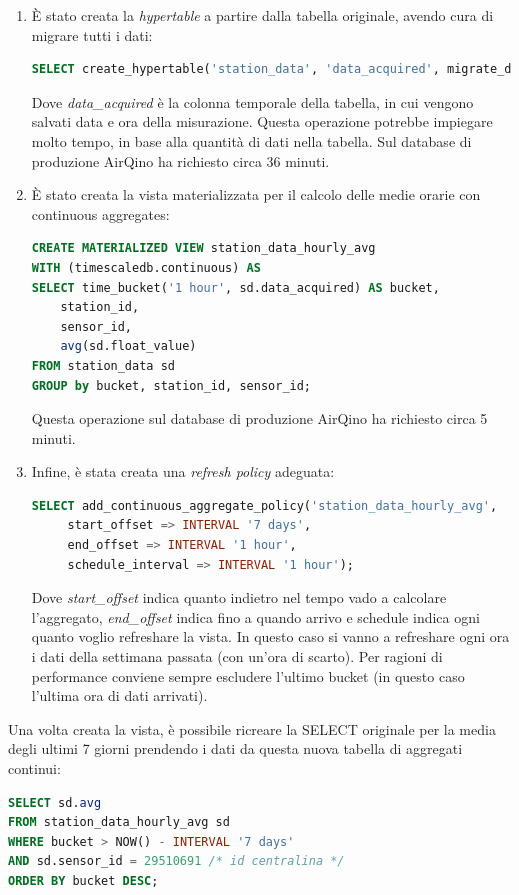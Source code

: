 \begin{enumerate}
  \item  È stato creata la \textit{hypertable} a partire dalla tabella originale, avendo cura di migrare tutti i dati:
\vspace{1mm}
\begin{lstlisting}[language=sql]
SELECT create_hypertable('station_data', 'data_acquired', migrate_data => true);
\end{lstlisting}
Dove \textit{data\_acquired} è la colonna temporale della tabella, in cui vengono salvati data e ora della misurazione.
Questa operazione potrebbe impiegare molto tempo, in base alla quantità di dati nella tabella. Sul database di produzione AirQino ha richiesto circa 36 minuti.
  \item È stato creata la vista materializzata per il calcolo delle medie orarie con continuous aggregates:
\vspace{1mm}
\begin{lstlisting}[language=sql]
CREATE MATERIALIZED VIEW station_data_hourly_avg
WITH (timescaledb.continuous) AS
SELECT time_bucket('1 hour', sd.data_acquired) AS bucket, 
    station_id,  
    sensor_id, 
    avg(sd.float_value) 
FROM station_data sd
GROUP by bucket, station_id, sensor_id;
\end{lstlisting}
Questa operazione sul database di produzione AirQino ha richiesto circa 5 minuti.
  \item Infine, è stata creata una \textit{refresh policy} adeguata:
\vspace{1mm}
\begin{lstlisting}[language=sql]
SELECT add_continuous_aggregate_policy('station_data_hourly_avg',
     start_offset => INTERVAL '7 days',
     end_offset => INTERVAL '1 hour',
     schedule_interval => INTERVAL '1 hour');
\end{lstlisting}
Dove \textit{start\_offset} indica quanto indietro nel tempo vado a calcolare l'aggregato, \textit{end\_offset} indica fino a quando arrivo e schedule indica ogni quanto voglio refreshare la vista.
In questo caso si vanno a refreshare ogni ora i dati della settimana passata (con un'ora di scarto).
Per ragioni di performance conviene sempre escludere l'ultimo bucket (in questo caso l'ultima ora di dati arrivati).
\end{enumerate}

Una volta creata la vista, è possibile ricreare la SELECT originale per la media degli ultimi 7 giorni prendendo i dati da questa nuova tabella di aggregati continui:
\vspace{1mm}
\begin{lstlisting}[language=sql]
SELECT sd.avg
FROM station_data_hourly_avg sd
WHERE bucket > NOW() - INTERVAL '7 days'
AND sd.sensor_id = 29510691 /* id centralina */
ORDER BY bucket DESC;
\end{lstlisting}

